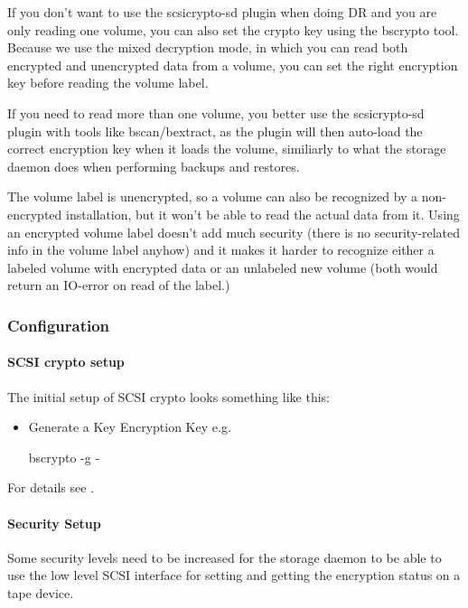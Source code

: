 If you don't want to use the scsicrypto-sd plugin when doing DR and you are only reading one volume, you can also set the crypto key using the bscrypto tool. Because we use the mixed decryption mode, in which you can read both encrypted and unencrypted data from a volume, you can set the right encryption key before reading the volume label.

If you need to read more than one volume, you better use the scsicrypto-sd plugin with tools like bscan/bextract, as the plugin will then auto-load the correct encryption key when it loads the volume, similiarly to what the storage daemon does when performing backups and restores.

The volume label is unencrypted, so a volume can also be recognized by a non-encrypted installation, but it won't be able to read the actual data from it. Using an encrypted volume label doesn't add much security (there is no security-related info in the volume label anyhow) and it makes it harder to recognize either a labeled volume with encrypted data or an unlabeled new volume (both would return an IO-error on read of the label.)

\subsubsection{Configuration}

\paragraph{SCSI crypto setup}
%
The initial setup of SCSI crypto looks something like this:
%
\begin{itemize}
 \item Generate a Key Encryption Key e.g.
\begin{commands}{}
bscrypto -g -
\end{commands}
\end{itemize}

For details see .



\paragraph{Security Setup}

Some security levels need to be increased for the storage daemon to be able to use the low level SCSI interface for setting and getting the encryption status on a tape device.

